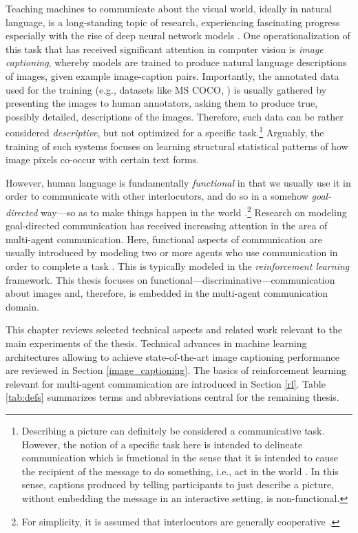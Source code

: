 Teaching machines to communicate about the visual world, ideally in natural language, is a long-standing topic of research, experiencing fascinating progress especially with the rise of deep neural network models \parencite{lecun2015deep, lake2017building}. 
One operationalization of this task that has received significant attention in computer vision is \textit{image captioning}, whereby models are trained to produce natural language descriptions of images, given example image-caption pairs. Importantly, the annotated data used for the training (e.g., datasets like MS COCO, \cite{chen2015microsoft}) is usually gathered by presenting the images to human annotators, asking them to produce true, possibly detailed, descriptions of the images. Therefore, such data can be rather considered \textit{descriptive}, but not optimized for a specific task.\footnote{Describing a picture can definitely be considered a communicative task. However, the notion of a specific task here is intended to delineate communication which is functional in the sense that it is intended to cause the recipient of the message to do something, i.e., act in the world \parencite{clark1996using, wittgenstein2010philosophical}. In this sense, captions produced by telling participants to just describe a picture, without embedding the message in an interactive setting, is non-functional.} Arguably, the training of such systems focuses on learning structural statistical patterns of how image pixels co-occur with certain text forms.

However, human language is fundamentally \textit{functional} in that we usually use it in order to communicate with other interlocutors, and do so in a somehow \textit{goal-directed} way---so as to make things happen in the world \parencite[e.g., ][]{wittgenstein2010philosophical, clark1996using}.\footnote{For simplicity, it is assumed that interlocutors are generally cooperative \parencite{grice1975logic}.} 
Research on modeling goal-directed communication has received increasing attention in the area of multi-agent communication. Here, functional aspects of communication are usually introduced by modeling two or more agents who use communication in order to complete a task \parencite{lazaridou2020emergent}. This is typically modeled in the \textit{reinforcement learning} framework. This thesis focuses on functional---discriminative---communication about images and, therefore, is embedded in the multi-agent communication domain. 

This chapter reviews selected technical aspects and related work relevant to the main experiments of the thesis. Technical advances in machine learning architectures allowing to achieve state-of-the-art image captioning performance are reviewed in Section \ref{image_captioning}. The basics of reinforcement learning relevant for multi-agent communication are introduced in Section \ref{rl}. Table \ref{tab:defs} summarizes terms and abbreviations central for the remaining thesis. 

